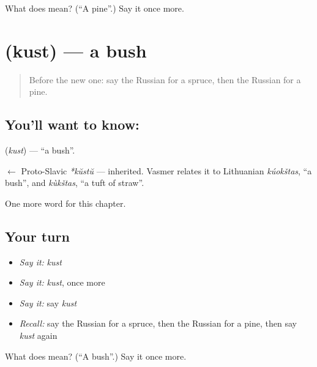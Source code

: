 \begin{tcolorbox}[breakable,colback=teal!4,colframe=teal!35!black,title={Before you move on}]
What does  mean? (\textquotedblleft{}A pine\textquotedblright{}.) Say it once more.
\end{tcolorbox}
\section[\texorpdfstring{\ru{куст} (kust)}{куст (kust)}]{ (kust) — a bush}

\label{lesson:RU-C224-kust}



\begin{quote}
Before the new one: say the Russian for a spruce, then the Russian for a pine.
\end{quote}

\subsection*{You'll want to know: }
\textbf{} (\emph{kust}) — \textquotedblleft{}a bush\textquotedblright{}.

\begin{cousinweb}
\textbf{} $\leftarrow$ Proto-Slavic \emph{*kŭstŭ} — inherited. Vasmer relates it to Lithuanian \emph{kúokštas}, \textquotedblleft{}a bush\textquotedblright{}, and \emph{kùkštas}, \textquotedblleft{}a tuft of straw\textquotedblright{}.
\end{cousinweb}

\begin{grammarlens}[title={What you've built}]
One more word for this chapter.
\end{grammarlens}

\subsection*{Your turn}
\begin{itemize}
\raggedright
  \item \emph{Say it:} \emph{kust}
  \item \emph{Say it:} \emph{kust}, once more
  \item \emph{Say it:} say \emph{kust}
  \item \emph{Recall:} say the Russian for a spruce, then the Russian for a pine, then say \emph{kust} again
\end{itemize}

\begin{tcolorbox}[breakable,colback=teal!4,colframe=teal!35!black,title={Before you move on}]
What does  mean? (\textquotedblleft{}A bush\textquotedblright{}.) Say it once more.
\end{tcolorbox}

